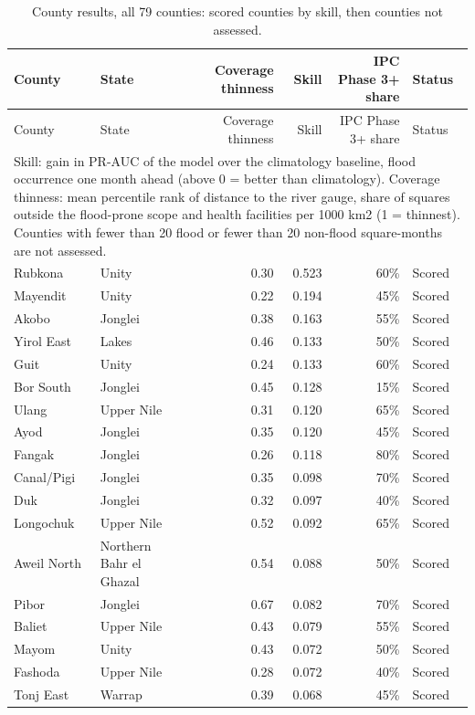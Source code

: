 \begin{longtable}{llrrrl}
\caption{County results, all 79 counties: scored counties by skill, then counties not assessed.}\label{tab:appA}\\
\hline County & State & Coverage thinness & Skill & IPC Phase 3+ share & Status \\ \hline
\endfirsthead
\hline County & State & Coverage thinness & Skill & IPC Phase 3+ share & Status \\ \hline
\endhead
\hline \multicolumn{6}{p{0.95\linewidth}}{\footnotesize Skill: gain in PR-AUC of the model over the climatology baseline, flood occurrence one month ahead (above 0 = better than climatology). Coverage thinness: mean percentile rank of distance to the river gauge, share of squares outside the flood-prone scope and health facilities per 1000 km2 (1 = thinnest). Counties with fewer than 20 flood or fewer than 20 non-flood square-months are not assessed.} \\
\endlastfoot
Rubkona & Unity & 0.30 & 0.523 & 60\% & Scored \\
Mayendit & Unity & 0.22 & 0.194 & 45\% & Scored \\
Akobo & Jonglei & 0.38 & 0.163 & 55\% & Scored \\
Yirol East & Lakes & 0.46 & 0.133 & 50\% & Scored \\
Guit & Unity & 0.24 & 0.133 & 60\% & Scored \\
Bor South & Jonglei & 0.45 & 0.128 & 15\% & Scored \\
Ulang & Upper Nile & 0.31 & 0.120 & 65\% & Scored \\
Ayod & Jonglei & 0.35 & 0.120 & 45\% & Scored \\
Fangak & Jonglei & 0.26 & 0.118 & 80\% & Scored \\
Canal/Pigi & Jonglei & 0.35 & 0.098 & 70\% & Scored \\
Duk & Jonglei & 0.32 & 0.097 & 40\% & Scored \\
Longochuk & Upper Nile & 0.52 & 0.092 & 65\% & Scored \\
Aweil North & Northern Bahr el Ghazal & 0.54 & 0.088 & 50\% & Scored \\
Pibor & Jonglei & 0.67 & 0.082 & 70\% & Scored \\
Baliet & Upper Nile & 0.43 & 0.079 & 55\% & Scored \\
Mayom & Unity & 0.43 & 0.072 & 50\% & Scored \\
Fashoda & Upper Nile & 0.28 & 0.072 & 40\% & Scored \\
Tonj East & Warrap & 0.39 & 0.068 & 45\% & Scored \\

\end{longtable}
